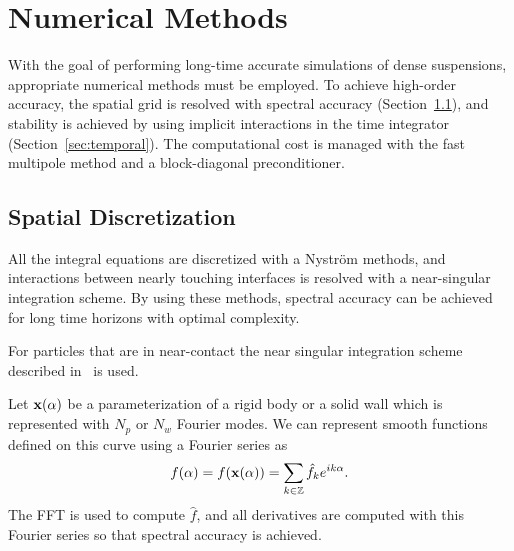 \documentclass[preprint, 10pt]{elsarticle}
\begin{document}
		
\section{Numerical Methods\label{s:method}} 

With the goal of performing long-time accurate simulations of dense
suspensions, appropriate numerical methods must be employed.  To achieve
high-order accuracy, the spatial grid is resolved with spectral accuracy
(Section~\ref{sec:spatial}), and stability is achieved by using implicit
interactions in the time integrator (Section~\ref{sec:temporal}). The computational cost is managed
with the fast multipole method
\cite{Greenbaum1992} and a
block-diagonal preconditioner.


\subsection{Spatial Discretization}\label{sec:spatial}

All the integral equations are discretized
with a Nystr\"om  methods, and interactions between nearly touching
interfaces is resolved with a near-singular integration scheme. By using
these methods, spectral accuracy can be achieved for long time horizons
with optimal complexity.

For particles that are in near-contact the near singular
integration scheme described in~\cite{Quaife2014, Ying2006} is used.

Let ${\mathbf{x}}(\alpha)$ be a parameterization of a rigid body or a solid
wall which is represented with $N_p$ or $N_w$ Fourier modes. We can represent
smooth functions defined on this curve using a
Fourier series as
\begin{align}
  f(\alpha) = f({\mathbf{x}}(\alpha)) = \sum_{k \in {\mathbb{Z}}} \hat{f}_k e^{ik\alpha}.
\end{align}
The FFT is used to compute $\hat{f}$, and all derivatives are computed
with this Fourier series so that spectral accuracy is achieved.
\end{document}
